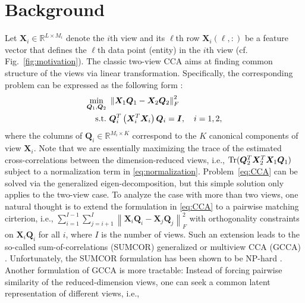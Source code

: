 \documentclass[10pt,journal]{IEEEtran}
\begin{document}
\section{Background}
Let ${\bm X}_i\in\mathbb{R}^{L\times M_i}$ denote
the $i$th view and its $\ell$th row ${\bm X}_i(\ell,:)$ be a feature vector that defines the $\ell$th data point (entity) in the $i$th view (cf. Fig.~\ref{fig:motivation}). 
The classic two-view CCA aims at finding common structure of the views via linear transformation.
Specifically, the corresponding problem can be expressed as the following form \cite{hardoon2004canonical}:
\begin{subequations}\label{eq:CCA}
\begin{align}
    \min_{{\bm Q}_1,{\bm Q}_2} &~\left\|{\bm X}_1{\bm Q}_1-{\bm X}_2{\bm Q}_2\right\|_F^2\\        
                                  {\rm s.t.} &~{\bm Q}_i^T\left({\bm X}_i^T{\bm X}_i\right){\bm Q}_i={\bm I},\quad i=1,2, \label{eq:normalization}
\end{align}
\end{subequations}
where the columns of ${\bm Q}_i\in\mathbb{R}^{M_i\times K}$ correspond to the $K$ canonical components of view ${\bm X}_i$.
Note that we are essentially maximizing the trace of the estimated cross-correlations between the dimension-reduced views, i.e., ${\rm Tr}( \bm{Q}_2^T\bm{X}_2^T\bm{X}_1\bm{Q}_1)$ subject to a normalization term in \eqref{eq:normalization}.  
Problem~\eqref{eq:CCA} can be solved via the generalized eigen-decomposition, but this simple solution only applies to the two-view case. 
To analyze the case with more than two views, 
one natural thought is to extend the formulation in \eqref{eq:CCA} to a pairwise matching cirterion, i.e., $\sum_{i=1}^{I-1}\sum_{j=i+1}^I\left\|{\bm X}_i{\bm Q}_i-{\bm X}_j{\bm Q}_j\right\|_F^2$ with orthogonality constraints on ${\bm X}_i{\bm Q}_i$ for all $i$, where $I$ is the number of views.
Such an extension leads to the so-called sum-of-correlations (SUMCOR) generalized or multiview CCA (GCCA) \cite{carroll1968generalization}.
Unfortunately, the SUMCOR formulation has been shown to be NP-hard \cite{rupnik2013comparison}.
Another formulation of GCCA is more tractable: Instead of forcing pairwise similarity of the reduced-dimension views,
one can seek a common latent representation of different views, i.e., \cite{carroll1968generalization,rastogimultiview,arora2014multi,van2006generalized,kettenring1971canonical}
\end{document}
